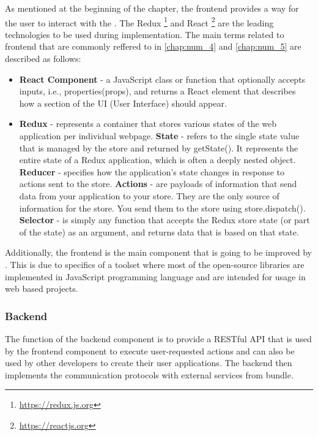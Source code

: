 As mentioned at the beginning of the chapter, the frontend provides a way for the user to interact with the \lpa{}. The Redux \footnote{\url{https://redux.js.org}} and React \footnote{\url{https://reactjs.org}} are the leading technologies to be used during implementation. The main terms related to \lpa{} frontend that are commonly reffered to in \autoref{chap:num_4} and \autoref{chap:num_5} are described as follows:

\begin{itemize}
    \item \textbf{React Component} - a JavaScript class or function that optionally accepts inputs, i.e., properties(props), and returns a React element that describes how a section of the UI (User Interface) should appear. 
    \item \textbf{Redux} - represents a container that stores various states of the web application per individual webpage.
    	\subitem \textbf{State} - refers to the single state value that is managed by the store and returned by getState(). It represents the entire state of a Redux application, which is often a deeply nested object.
        \subitem \textbf{Reducer} - specifies how the application's state changes in response to actions sent to the store.
        \subitem \textbf{Actions} - are payloads of information that send data from your application to your store. They are the only source of information for the store. You send them to the store using store.dispatch().
        \subitem \textbf{Selector} - is simply any function that accepts the Redux store state (or part of the state) as an argument, and returns data that is based on that state.
\end{itemize}

Additionally, the \lpa{} frontend is the main component that is going to be improved by \lpas{}. This is due to specifics of a \solid{} toolset where most of the open-source libraries are implemented in JavaScript programming language and are intended for usage in web based projects.

\subsubsection{Backend}

The function of the backend component is to provide a RESTful API that is used by the frontend component to execute user-requested actions and can also be used by other developers to create their user applications. The backend then implements the communication protocols with external services from \lps{} bundle. 

